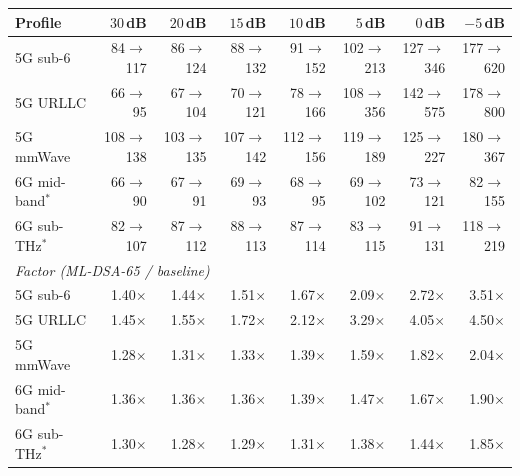 \begin{tabular}{@{}lrrrrrrr@{}}
\toprule
Profile & $30$\,dB & $20$\,dB & $15$\,dB & $10$\,dB & $5$\,dB & $0$\,dB & $-5$\,dB \\
\midrule
5G sub-6 & 84$\to$117 & 86$\to$124 & 88$\to$132 & 91$\to$152 & 102$\to$213 & 127$\to$346 & 177$\to$620 \\
5G URLLC & 66$\to$95 & 67$\to$104 & 70$\to$121 & 78$\to$166 & 108$\to$356 & 142$\to$575 & 178$\to$800 \\
5G mmWave & 108$\to$138 & 103$\to$135 & 107$\to$142 & 112$\to$156 & 119$\to$189 & 125$\to$227 & 180$\to$367 \\
6G mid-band$^\ast$ & 66$\to$90 & 67$\to$91 & 69$\to$93 & 68$\to$95 & 69$\to$102 & 73$\to$121 & 82$\to$155 \\
6G sub-THz$^\ast$ & 82$\to$107 & 87$\to$112 & 88$\to$113 & 87$\to$114 & 83$\to$115 & 91$\to$131 & 118$\to$219 \\
\midrule
\multicolumn{8}{l}{\textit{Factor (ML-DSA-65 / baseline)}} \\
5G sub-6 & 1.40$\times$ & 1.44$\times$ & 1.51$\times$ & 1.67$\times$ & 2.09$\times$ & 2.72$\times$ & 3.51$\times$ \\
5G URLLC & 1.45$\times$ & 1.55$\times$ & 1.72$\times$ & 2.12$\times$ & 3.29$\times$ & 4.05$\times$ & 4.50$\times$ \\
5G mmWave & 1.28$\times$ & 1.31$\times$ & 1.33$\times$ & 1.39$\times$ & 1.59$\times$ & 1.82$\times$ & 2.04$\times$ \\
6G mid-band$^\ast$ & 1.36$\times$ & 1.36$\times$ & 1.36$\times$ & 1.39$\times$ & 1.47$\times$ & 1.67$\times$ & 1.90$\times$ \\
6G sub-THz$^\ast$ & 1.30$\times$ & 1.28$\times$ & 1.29$\times$ & 1.31$\times$ & 1.38$\times$ & 1.44$\times$ & 1.85$\times$ \\
\bottomrule
\end{tabular}

